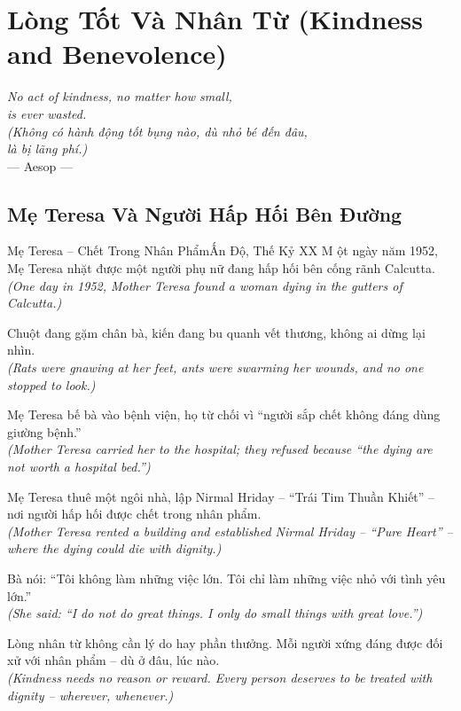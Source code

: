 \chapter{Lòng Tốt Và Nhân Từ (Kindness and Benevolence)}
\begin{center}
  \textit{\color{truyenblue}No act of kindness, no matter how small,\\
  is ever wasted.}\\
  \textit{(Không có hành động tốt bụng nào, dù nhỏ bé đến đâu,\\
  là bị lãng phí.)}\\[4pt]
  \small\color{truyengold}--- Aesop ---
\end{center}
\ngancach

\section{Mẹ Teresa Và Người Hấp Hối Bên Đường}
\begin{truyen}{Mẹ Teresa -- Chết Trong Nhân Phẩm}{Ấn Độ, Thế Kỷ XX}
M ột ngày năm 1952, Mẹ Teresa nhặt được một người phụ nữ đang hấp hối bên cống rãnh Calcutta.\\
\textit{(One day in 1952, Mother Teresa found a woman dying in the gutters of Calcutta.)}

Chuột đang gặm chân bà, kiến đang bu quanh vết thương, không ai dừng lại nhìn.\\
\textit{(Rats were gnawing at her feet, ants were swarming her wounds, and no one stopped to look.)}

Mẹ Teresa bế bà vào bệnh viện, họ từ chối vì ``người sắp chết không đáng dùng giường bệnh.''\\
\textit{(Mother Teresa carried her to the hospital; they refused because ``the dying are not worth a hospital bed.'')}

Mẹ Teresa thuê một ngôi nhà, lập Nirmal Hriday -- ``Trái Tim Thuần Khiết'' -- nơi người hấp hối được chết trong nhân phẩm.\\
\textit{(Mother Teresa rented a building and established Nirmal Hriday -- ``Pure Heart'' -- where the dying could die with dignity.)}

Bà nói: ``Tôi không làm những việc lớn. Tôi chỉ làm những việc nhỏ với tình yêu lớn.''\\
\textit{(She said: ``I do not do great things. I only do small things with great love.'')}

\end{truyen}
\begin{baihoc}
  Lòng nhân từ không cần lý do hay phần thưởng. Mỗi người xứng đáng được đối xử với nhân phẩm -- dù ở đâu, lúc nào.\\
  \textit{(Kindness needs no reason or reward. Every person deserves to be treated with dignity -- wherever, whenever.)}
\end{baihoc}

